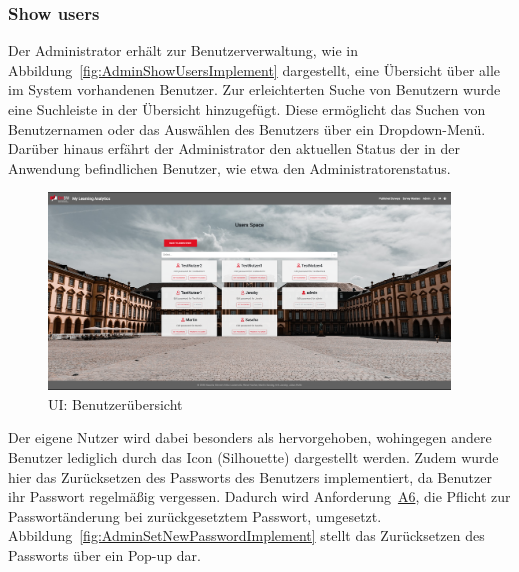 \subsubsection*{Show users \faUsers}

Der Administrator erhält zur Benutzerverwaltung, wie in Abbildung~\vref{fig:AdminShowUsersImplement} dargestellt, eine Übersicht über alle im System vorhandenen Benutzer.
Zur erleichterten Suche von Benutzern wurde eine Suchleiste in der Übersicht hinzugefügt.
Diese ermöglicht das Suchen von Benutzernamen oder das Auswählen des Benutzers über ein Dropdown-Menü.
Darüber hinaus erfährt der Administrator den aktuellen Status der in der Anwendung befindlichen Benutzer, wie etwa den Administratorenstatus.

\begin{figure}[H]
	\centering
	\includegraphics[width=0.95\textwidth, keepaspectratio]{img/client/AdminShowUsers.png}
	\captionsetup{justification=centering, format=plain}
	\caption[\acl{UI}: Benutzerübersicht]{\acl{UI}: Benutzerübersicht \\ \quelleScreenshot}
	\label{fig:AdminShowUsersImplement}
\end{figure}

Der eigene Nutzer wird dabei besonders als \faUser\xspace hervorgehoben, wohingegen andere Benutzer lediglich durch das Icon \faUser[regular]\xspace (Silhouette) dargestellt werden. \newline
Zudem wurde hier das Zurücksetzen des Passworts des Benutzers implementiert, da Benutzer ihr Passwort regelmäßig vergessen.\autocite[Vgl.][]{statistaPasswortVergessen}
Dadurch wird Anforderung~\hyperref[Anf:A6]{A6}, die Pflicht zur Passwortänderung bei zurückgesetztem Passwort, umgesetzt.
Abbildung~\vref{fig:AdminSetNewPasswordImplement} stellt das Zurücksetzen des Passworts über ein Pop-up dar.

